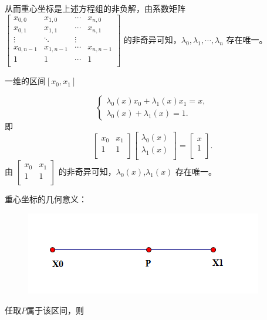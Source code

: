 \documentclass[12pt,a4paper]{article}
\begin{document}
从而重心坐标是上述方程组的非负解，由系数矩阵 
$\begin{bmatrix}
x_{0,0} & x_{1,0} & \cdots & x_{n,0}\\
x_{0,1} & x_{1,1} & \cdots & x_{n,1}\\
\vdots & \ddots & \vdots \\
x_{0,n-1} & x_{1,n-1} & \cdots & x_{n,n-1}\\
1 & 1 & \cdots & 1\\
\end{bmatrix}$ 的非奇异可知，$\lambda _0,\lambda _1,\cdots ,\lambda _n$ 存在唯一。

一维的区间$[x_0,x_1]$

$$
\begin{cases}
\lambda _0(x)x_0+\lambda _1(x)x_1=x,\\
\lambda _0(x)+\lambda _1(x)=1.
\end{cases}
$$
即
$$
\begin{bmatrix}
x_0 & x_1 \\
1 & 1 \\
\end{bmatrix}
\begin{bmatrix}
\lambda _0(x)\\
\lambda _1(x)\\
\end{bmatrix}=\begin{bmatrix}
x\\
1\\
\end{bmatrix}.
$$
由 $\begin{bmatrix}
x_0 & x_1 \\
1 & 1 \\
\end{bmatrix}$ 的非奇异可知，$\lambda _0(x)$,$\lambda _1(x)$ 存在唯一。

重心坐标的几何意义：

\begin{figure}[H]
\centering
\includegraphics[scale=0.7]{./figures/1.png}
\caption{}
\end{figure}

任取$P$属于该区间，则
\end{document}
